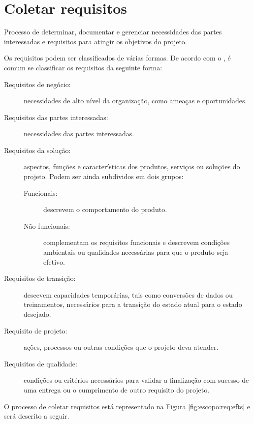 \chapter{Coletar requisitos}

Processo de determinar, documentar e gerenciar necessidades das partes interessadas e requisitos para atingir os objetivos do projeto. 

Os requisitos podem ser classificados de várias formas. De acordo com o \bok, é comum se classificar os requisitos da seguinte forma:

\begin{description}
	
	\item[Requisitos de negócio:] necessidades de alto nível da organização, como ameaças e oportunidades.
	
	\item[Requisitos das partes interessadas:] necessidades das partes interessadas.
	
	\item[Requisitos da solução:] aspectos, funções e características dos produtos, serviços ou soluções do projeto. Podem ser ainda subdividos em dois grupos:
	
		\begin{description}
			
			\item[Funcionais:] descrevem o comportamento do produto.
			
			\item[Não funcionais:] complementam os requisitos funcionais e descrevem condições ambientais ou qualidades necessárias para que o produto seja efetivo.
			
		\end{description}
		
	\item[Requisitos de transição:] descevem capacidades temporárias, tais como conversões de dados ou treinamentos, necessários para a transição do estado atual para o estado desejado.
	
	\item[Requisito de projeto:] ações, processos ou outras condições que o projeto deva atender.
	
	\item[Requisitos de qualidade:] condições ou critérios necessários para validar a finalização com sucesso de uma entrega ou o cumprimento de outro requisito do projeto.
		
\end{description}
O processo de coletar requisitos está representado na Figura \ref{fig:escopo:req:efts} e será descrito a seguir.


